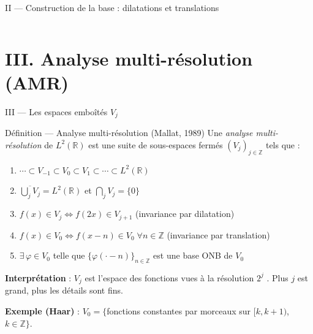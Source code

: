 \documentclass[10pt]{beamer}
\newcommand{\RR}{\mathbb{R}}
\newcommand{\ZZ}{\mathbb{Z}}
\begin{document}
\begin{frame}{II — Construction de la base : dilatations et translations}
\begin{columns}[T]
\begin{center}
			\end{center}
			
		\end{columns}
		
	\end{frame}
	
	\section{III. Analyse multi-résolution (AMR)}
	
	\begin{frame}{III — Les espaces emboîtés $V_j$}
		
		\begin{block}{Définition — Analyse multi-résolution (Mallat, 1989)}
			Une \emph{analyse multi-résolution} de $L^2(\RR)$ est une suite de
			sous-espaces fermés $(V_j)_{j \in \ZZ}$ tels que :
			\begin{enumerate}
				\item $\cdots \subset V_{-1} \subset V_0 \subset V_1 \subset \cdots \subset L^2(\RR)$
				\item $\overline{\bigcup_j V_j} = L^2(\RR)$ et $\bigcap_j V_j = \{0\}$
				\item $f(x) \in V_j \iff f(2x) \in V_{j+1}$ \quad (invariance par dilatation)
				\item $f(x) \in V_0 \iff f(x - n) \in V_0\; \forall n \in \ZZ$ \quad (invariance par translation)
				\item $\exists\, \varphi \in V_0$ telle que $\{\varphi(\cdot - n)\}_{n \in \ZZ}$ est une base ONB de $V_0$
			\end{enumerate}
		\end{block}
		
		\medskip
		\textbf{Interprétation} : $V_j$ est l'espace des fonctions \og vues
		à la résolution $2^j$ \fg. Plus $j$ est grand, plus les détails sont fins.
		
		\medskip
		\textbf{Exemple (Haar)} :
		$V_0 = \{$fonctions constantes par morceaux sur $[k, k+1)$, $k \in \ZZ\}$.
		
	\end{frame}
	
\end{document}
